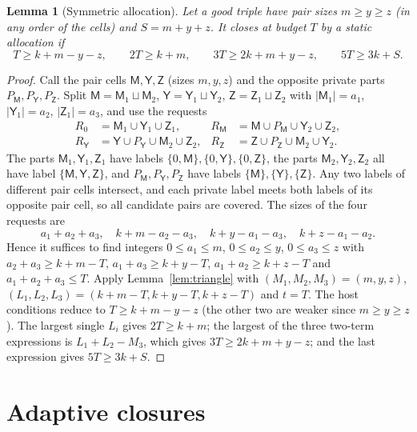 \documentclass[11pt]{article}
\numberwithin{equation}{section}
\newtheorem{lemma}[theorem]{Lemma}
\theoremstyle{definition}
\theoremstyle{remark}
\begin{document}
\begin{lemma}[Symmetric allocation]\label{lem:symmetric}
Let a good triple have pair sizes $m\ge y\ge z$ (in any order of the
cells) and $S=m+y+z$. It closes at budget $T$ by a static allocation if
\[
 T\ge k+m-y-z,\qquad 2T\ge k+m,\qquad 3T\ge2k+m+y-z,\qquad 5T\ge3k+S.
\]
\end{lemma}
\begin{proof}
Call the pair cells $\mathsf M,\mathsf Y,\mathsf Z$ (sizes $m,y,z$) and
the opposite private parts $P_{\mathsf M},P_{\mathsf Y},P_{\mathsf Z}$.
Split $\mathsf M=\mathsf M_1\sqcup \mathsf M_2$,
$\mathsf Y=\mathsf Y_1\sqcup \mathsf Y_2$,
$\mathsf Z=\mathsf Z_1\sqcup \mathsf Z_2$ with
$|\mathsf M_1|=a_1$, $|\mathsf Y_1|=a_2$, $|\mathsf Z_1|=a_3$, and use
the requests
\begin{align*}
 R_0&=\mathsf M_1\cup \mathsf Y_1\cup \mathsf Z_1,&
 R_{\mathsf M}&=\mathsf M\cup P_{\mathsf M}\cup \mathsf Y_2\cup \mathsf Z_2,\\
 R_{\mathsf Y}&=\mathsf Y\cup P_{\mathsf Y}\cup \mathsf M_2\cup \mathsf Z_2,&
 R_{\mathsf Z}&=\mathsf Z\cup P_{\mathsf Z}\cup \mathsf M_2\cup \mathsf Y_2.
\end{align*}
The parts $\mathsf M_1,\mathsf Y_1,\mathsf Z_1$ have labels
$\{0,\mathsf M\},\{0,\mathsf Y\},\{0,\mathsf Z\}$, the parts
$\mathsf M_2,\mathsf Y_2,\mathsf Z_2$ all have label
$\{\mathsf M,\mathsf Y,\mathsf Z\}$, and $P_{\mathsf M},P_{\mathsf Y},
P_{\mathsf Z}$ have labels $\{\mathsf M\},\{\mathsf Y\},\{\mathsf Z\}$.
Any two labels of different pair cells intersect, and each private label
meets both labels of its opposite pair cell, so all candidate pairs are
covered. The sizes of the four requests are
\[
 a_1+a_2+a_3,\quad k+m-a_2-a_3,\quad k+y-a_1-a_3,\quad k+z-a_1-a_2 .
\]
Hence it suffices to find integers $0\le a_1\le m$, $0\le a_2\le y$,
$0\le a_3\le z$ with $a_2+a_3\ge k+m-T$, $a_1+a_3\ge k+y-T$,
$a_1+a_2\ge k+z-T$ and $a_1+a_2+a_3\le T$. Apply
Lemma~\ref{lem:triangle} with $(M_1,M_2,M_3)=(m,y,z)$,
$(L_1,L_2,L_3)=(k+m-T,k+y-T,k+z-T)$ and $t=T$. The host conditions
reduce to $T\ge k+m-y-z$ (the other two are weaker since $m\ge y\ge z$).
The largest single $L_i$ gives $2T\ge k+m$; the largest of the three
two-term expressions is $L_1+L_2-M_3$, which gives $3T\ge2k+m+y-z$;
and the last expression gives $5T\ge3k+S$.
\end{proof}

\section{Adaptive closures}\label{sec:adaptive}
\end{document}
